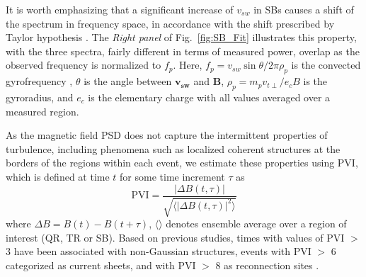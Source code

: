 \documentclass[]{aastex62}
\begin{document}
It is worth emphasizing that a significant increase of $v_{sw}$ in SBs causes a shift of the spectrum in frequency space, in accordance with the shift prescribed by Taylor hypothesis \citep{Taylor_1938_RSPSA}. The \emph{Right panel} of Fig.~\ref{fig:SB_Fit} illustrates this property, with the three spectra, fairly different in terms of measured power, overlap as the observed frequency is normalized to $f_p$. Here, $f_p = v_{sw} \sin{\theta}/2\pi\rho_p$ is the convected gyrofrequency \citep{Bourouaine_2013}, $\theta$ is the angle between $\mathbf{v_{sw}}$ and \textbf{B}, $\rho_p = m_p v_{t\perp} / e_c B$ is the gyroradius, and $e_c$ is the elementary charge with all values averaged over a measured region. 


As the magnetic field PSD does not capture the intermittent properties of turbulence, including phenomena such as localized coherent structures at the borders of the regions within each event, we estimate these properties using PVI, which is defined at time $t$ for some time increment $\tau$ as
%
\begin{equation}
    \mathrm{PVI} = \frac{|\Delta B (t, \tau)|}{\sqrt{\langle |\Delta B (t, \tau)|^2 \rangle}} 
\end{equation}
%
where $\Delta B = B(t) - B(t+\tau)$, $\langle\rangle$ denotes ensemble average over a region of interest (QR, TR or SB).
Based on previous studies, times with values of PVI $>$ 3 have been associated with non-Gaussian structures, events with PVI $>$ 6 categorized as current sheets, and with PVI $>$ 8 as reconnection sites \citep{Matthaeus_1982_JGR,Osman_2012,Greco_2018_SSRv,Chhiber_2020_ApJS}.

\end{document}
